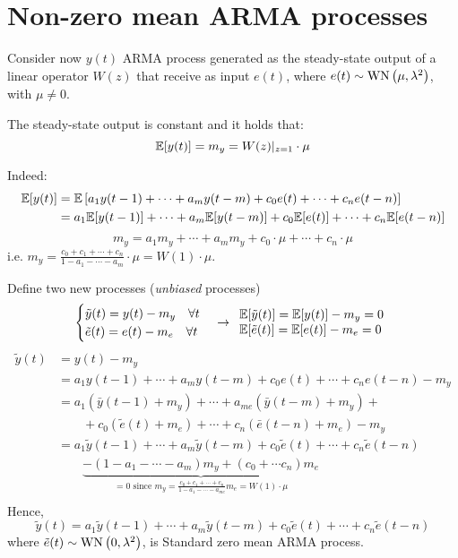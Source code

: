 \section{Non-zero mean ARMA processes}\label{sec:non-zero-mean-arma}
Consider now $y(t)$ ARMA process generated as the steady-state output of a linear operator $W(z)$ that receive as input $e(t)$, where $e(t) \sim \operatorname{WN}\left(\mu, \lambda^{2}\right)$, with $\mu\neq0$.

\begin{theorem}\label{thm:gain-theorem}
	The steady-state output is constant and it holds that:
	\[
		\mathbb{E}[y(t)]=m_{y}=W(z)|_{z=1} \cdot \mu
	\]
\end{theorem}

Indeed:
\begin{align*}
		\mathbb{E}[y(t)] &=\mathbb{E}\left[a_{1} y(t-1)+\cdots+a_{m} y(t-m)+c_{0} e(t)+\cdots+c_{n} e(t-n)\right] \\
		&=a_{1} \mathbb{E}[y(t-1)]+\cdots+a_{m} \mathbb{E}[y(t-m)]+c_{0} \mathbb{E}[e(t)]+\cdots+c_{n} \mathbb{E}[e(t-n)]
\end{align*}
$$
m_{y}=a_{1} m_{y}+\cdots+a_{m} m_{y}+c_{0} \cdot \mu+\cdots+c_{n} \cdot \mu
$$
i.e. $m_{y}=\frac{c_{0}+c_{1}+\cdots+c_{n}}{1-a_{1}-\cdots-a_{m}} \cdot \mu=W(1) \cdot \mu$.
	
Define two new processes (\emph{unbiased} processes)
$$
\begin{cases}
	\tilde{y}(t)=y(t)-m_{y} \quad\forall t\\
	\tilde{e}(t)=e(t)-m_{e} \quad\forall t
\end{cases}
\rightarrow \begin{array}{l}
	\mathbb{E}[\tilde{y}(t)]=\mathbb{E}[y(t)]-m_{y}=0 \\
	\mathbb{E}[\tilde{e}(t)]=\mathbb{E}[e(t)]-m_{e}=0
\end{array}
$$
\begin{align*}
	\tilde{y}(t)&= y(t)-m_{y}\\
	&= a_{1} y(t-1)+\cdots+a_{m} y(t-m)+c_{0} e(t)+\cdots+c_{n} e(t-n)-m_{y} \\
	&= a_{1}\left(\bar{y}(t-1)+m_{y}\right)+\cdots+a_{m e}\left(\bar{y}(t-m)+m_{y}\right)+\\
	&\qquad +c_{0}\left(\tilde{e}(t)+m_{e}\right)+\cdots+c_{n}\left(\bar{e}(t-n)+m_{e}\right)-m_{y} \\
	&= a_{1} \tilde{y}(t-1)+\cdots+a_{m} \tilde{y}(t-m)+c_{0} \tilde{e}(t)+\cdots+c_{n} \tilde{e}(t-n) \\
	&\qquad \underbrace{-\left(1-a_{1}-\cdots-a_{m}\right) m_{y}+\left(c_{0}+\cdots c_{n}\right) m_{e}}_{=0\text { since } m_{y}=\frac{c_{0}+c_{1}+\cdots+c_{n}}{1-a_{1}-\cdots-a_{m e}} m_{e}=W(1) \cdot \mu} \\
\end{align*}
Hence,
$$
\tilde{y}(t)=a_{1} \tilde{y}(t-1)+\cdots+a_{m} \tilde{y}(t-m)+c_{0} \tilde{e}(t)+\cdots+c_{n} \tilde{e}(t-n)
$$
where $\tilde{e}(t)\sim \operatorname{WN}\left(0, \lambda^{2}\right)$, is Standard zero mean ARMA process.

